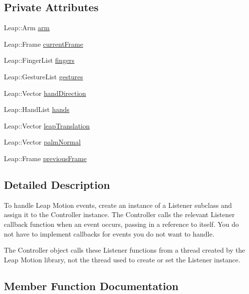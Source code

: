 \subsection*{Private Attributes}
\begin{DoxyCompactItemize}
\item 
Leap\+::\+Arm \hyperlink{classLeapListener_adfad4850146dbbf8f098f53e540d2afc}{arm}
\item 
Leap\+::\+Frame \hyperlink{classLeapListener_a64eb85f79e30335bfb863ab0e5e0e524}{current\+Frame}
\item 
Leap\+::\+Finger\+List \hyperlink{classLeapListener_a5a04519bc2603793328375ad5e049773}{fingers}
\item 
Leap\+::\+Gesture\+List \hyperlink{classLeapListener_a724e5b46ff12f8982cbc4c378cfc7323}{gestures}
\item 
Leap\+::\+Vector \hyperlink{classLeapListener_ad8458a1467b2909621a4b1f116a4b5be}{hand\+Direction}
\item 
Leap\+::\+Hand\+List \hyperlink{classLeapListener_ac01cc7c1b36a473a942842b6068a8bc1}{hands}
\item 
Leap\+::\+Vector \hyperlink{classLeapListener_a31f0ee8db7d3954d0b2a7cc7c6cd5670}{leap\+Translation}
\item 
Leap\+::\+Vector \hyperlink{classLeapListener_ae084bdb6078ae06576cc4b6e678ed094}{palm\+Normal}
\item 
Leap\+::\+Frame \hyperlink{classLeapListener_a9182964b8502db776d1125fbb843a2a8}{previous\+Frame}
\end{DoxyCompactItemize}


\subsection{Detailed Description}
To handle Leap Motion events, create an instance of a Listener subclass and assign it to the Controller instance. The Controller calls the relevant Listener callback function when an event occurs, passing in a reference to itself. You do not have to implement callbacks for events you do not want to handle.

The Controller object calls these Listener functions from a thread created by the Leap Motion library, not the thread used to create or set the Listener instance. 

\subsection{Member Function Documentation}
